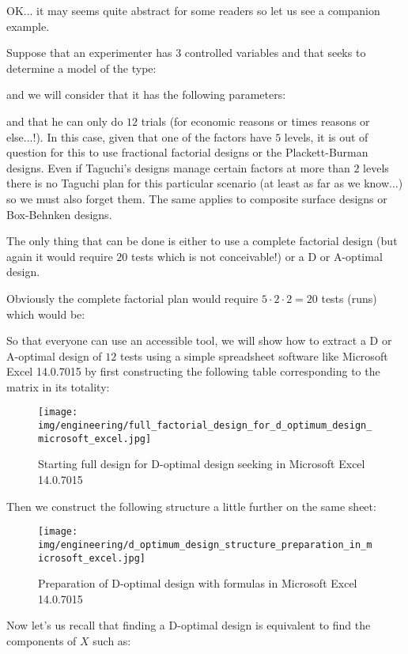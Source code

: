 	OK... it may seems quite abstract for some readers so let us see a companion example.
	
	Suppose that an experimenter has $3$ controlled variables and that seeks to determine a model of the type:
	
 	and we will consider that it has the following parameters:
	
	and that he can only do $12$ trials (for economic reasons or times reasons or else...!). In this case, given that one of the factors have $5$ levels, it is out of question for this to use fractional factorial designs or the Plackett-Burman designs. Even if Taguchi's designs manage certain factors at more than $2$ levels there is no Taguchi plan for this particular scenario (at least as far as we know...) so we must also forget them. The same applies to composite surface designs or Box-Behnken designs.

	The only thing that can be done is either to use a complete factorial design (but again it would require $20$ tests which is not conceivable!) or a D or A-optimal design.

	Obviously the complete factorial plan would require $5\cdot 2\cdot 2=20$ tests (runs) which would be:
	
	So that everyone can use an accessible tool, we will show how to extract a D or A-optimal design of $12$ tests using a simple spreadsheet software like Microsoft Excel 14.0.7015 by first constructing the following table corresponding to the matrix in its totality:
	\begin{figure}[H]
		\centering
		\texttt{[image: img/engineering/full\_factorial\_design\_for\_d\_optimum\_design\_microsoft\_excel.jpg]}
		\caption[]{Starting full design for D-optimal design seeking in Microsoft Excel 14.0.7015}	
	\end{figure}
	Then we construct the following structure a little further on the same sheet:
	\begin{figure}[H]
		\centering
		\texttt{[image: img/engineering/d\_optimum\_design\_structure\_preparation\_in\_microsoft\_excel.jpg]}
		\caption[]{Preparation of D-optimal design with formulas in Microsoft Excel 14.0.7015}	
	\end{figure}
	Now let's us recall that finding a D-optimal design is equivalent to find the components of $X$ such as:
	
